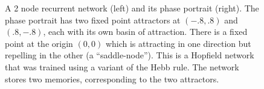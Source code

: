 \begin{figure}[h]
\centering
{}
\hspace*{1in}
\caption[Left: Simbrain screenshot; Right: Jeff Yoshimi.]{A 2 node recurrent network (left) and its phase portrait (right). The phase portrait has two fixed point attractors at $(-.8,.8)$ and $(.8,-.8)$, each with its own basin of attraction. There is a fixed point at the origin $(0,0)$ which is attracting in one direction but repelling in the other (a ``saddle-node''). This is a Hopfield network that was trained using a variant of the Hebb rule. The network stores two memories, corresponding to the two attractors.}
\label{F:hopfieldStateSpace}
\end{figure}

